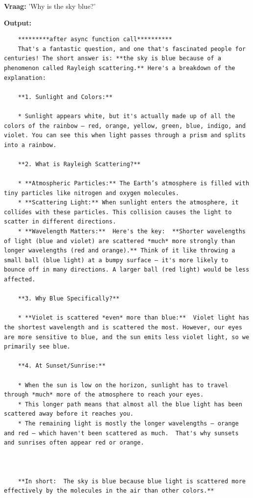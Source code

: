 \textbf{Vraag:} 'Why is the sky blue?'

\textbf{Output:}

\begin{verbatim}
    *********after async function call**********
    That's a fantastic question, and one that's fascinated people for centuries! The short answer is: **the sky is blue because of a phenomenon called Rayleigh scattering.** Here's a breakdown of the explanation:
    
    **1. Sunlight and Colors:**
    
    * Sunlight appears white, but it's actually made up of all the colors of the rainbow – red, orange, yellow, green, blue, indigo, and violet. You can see this when light passes through a prism and splits into a rainbow.
    
    **2. What is Rayleigh Scattering?**
    
    * **Atmospheric Particles:** The Earth’s atmosphere is filled with tiny particles like nitrogen and oxygen molecules.
    * **Scattering Light:** When sunlight enters the atmosphere, it collides with these particles. This collision causes the light to scatter in different directions.
    * **Wavelength Matters:**  Here's the key:  **Shorter wavelengths of light (blue and violet) are scattered *much* more strongly than longer wavelengths (red and orange).** Think of it like throwing a small ball (blue light) at a bumpy surface – it's more likely to bounce off in many directions. A larger ball (red light) would be less affected.
    
    **3. Why Blue Specifically?**
    
    * **Violet is scattered *even* more than blue:**  Violet light has the shortest wavelength and is scattered the most. However, our eyes are more sensitive to blue, and the sun emits less violet light, so we primarily see blue.
    
    **4. At Sunset/Sunrise:**
    
    * When the sun is low on the horizon, sunlight has to travel through *much* more of the atmosphere to reach your eyes.
    * This longer path means that almost all the blue light has been scattered away before it reaches you.
    * The remaining light is mostly the longer wavelengths – orange and red – which haven't been scattered as much.  That's why sunsets and sunrises often appear red or orange.
    
    
    
    **In short:  The sky is blue because blue light is scattered more effectively by the molecules in the air than other colors.**
    

\end{verbatim}
